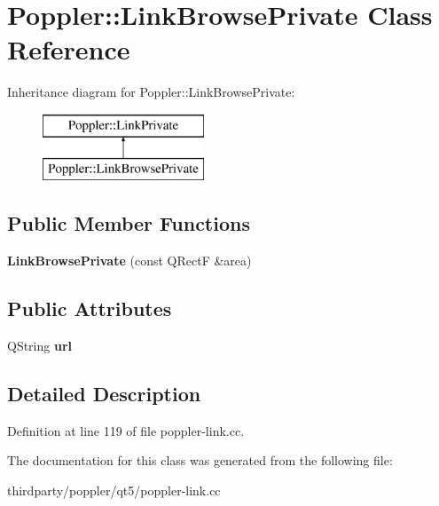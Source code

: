\hypertarget{class_poppler_1_1_link_browse_private}{}\section{Poppler\+:\+:Link\+Browse\+Private Class Reference}
\label{class_poppler_1_1_link_browse_private}
Inheritance diagram for Poppler\+:\+:Link\+Browse\+Private\+:\begin{figure}[H]
\begin{center}
\leavevmode
\includegraphics[height=2.000000cm]{class_poppler_1_1_link_browse_private}
\end{center}
\end{figure}
\subsection*{Public Member Functions}
\begin{DoxyCompactItemize}
\item 
\mbox{\label{class_poppler_1_1_link_browse_private_a32ff32a7402711d8e87c84206b1a23b5}} 
{\bfseries Link\+Browse\+Private} (const Q\+RectF \&area)
\end{DoxyCompactItemize}
\subsection*{Public Attributes}
\begin{DoxyCompactItemize}
\item 
\mbox{\label{class_poppler_1_1_link_browse_private_a5cd050d8f9ac930f2cad57700ae3f430}} 
Q\+String {\bfseries url}
\end{DoxyCompactItemize}


\subsection{Detailed Description}


Definition at line 119 of file poppler-\/link.\+cc.



The documentation for this class was generated from the following file\+:\begin{DoxyCompactItemize}
\item 
thirdparty/poppler/qt5/poppler-\/link.\+cc\end{DoxyCompactItemize}
